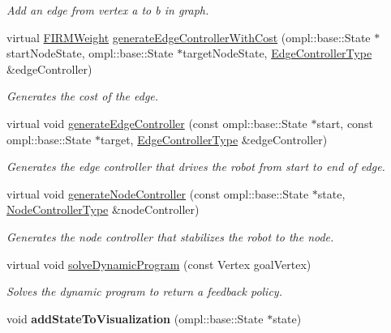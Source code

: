 \begin{DoxyCompactItemize}
\begin{DoxyCompactList}\small\item\em \-Add an edge from vertex a to b in graph. \end{DoxyCompactList}\item 
\hypertarget{class_f_i_r_m_a0f58525bdbc4277a3dae5242aa5efc04}{virtual \hyperlink{class_f_i_r_m_weight}{\-F\-I\-R\-M\-Weight} \hyperlink{class_f_i_r_m_a0f58525bdbc4277a3dae5242aa5efc04}{generate\-Edge\-Controller\-With\-Cost} (ompl\-::base\-::\-State $\ast$start\-Node\-State, ompl\-::base\-::\-State $\ast$target\-Node\-State, \hyperlink{class_f_i_r_m_a70abcb24fbc9f836b94119f65c8f8a37}{\-Edge\-Controller\-Type} \&edge\-Controller)}\label{class_f_i_r_m_a0f58525bdbc4277a3dae5242aa5efc04}

\begin{DoxyCompactList}\small\item\em \-Generates the cost of the edge. \end{DoxyCompactList}\item 
\hypertarget{class_f_i_r_m_abfccb43f41872b8da9a4609c1748d21f}{virtual void \hyperlink{class_f_i_r_m_abfccb43f41872b8da9a4609c1748d21f}{generate\-Edge\-Controller} (const ompl\-::base\-::\-State $\ast$start, const ompl\-::base\-::\-State $\ast$target, \hyperlink{class_f_i_r_m_a70abcb24fbc9f836b94119f65c8f8a37}{\-Edge\-Controller\-Type} \&edge\-Controller)}\label{class_f_i_r_m_abfccb43f41872b8da9a4609c1748d21f}

\begin{DoxyCompactList}\small\item\em \-Generates the edge controller that drives the robot from start to end of edge. \end{DoxyCompactList}\item 
\hypertarget{class_f_i_r_m_a1856164aa0dba82e6cfad26a4ef5a7fe}{virtual void \hyperlink{class_f_i_r_m_a1856164aa0dba82e6cfad26a4ef5a7fe}{generate\-Node\-Controller} (const ompl\-::base\-::\-State $\ast$state, \hyperlink{class_controller}{\-Node\-Controller\-Type} \&node\-Controller)}\label{class_f_i_r_m_a1856164aa0dba82e6cfad26a4ef5a7fe}

\begin{DoxyCompactList}\small\item\em \-Generates the node controller that stabilizes the robot to the node. \end{DoxyCompactList}\item 
virtual void \hyperlink{class_f_i_r_m_a7ffdc57247b8f40899646195750b6a20}{solve\-Dynamic\-Program} (const \-Vertex goal\-Vertex)
\begin{DoxyCompactList}\small\item\em \-Solves the dynamic program to return a feedback policy. \end{DoxyCompactList}\item 
\hypertarget{class_f_i_r_m_a4003d4144f6c32e9eaba79f292ec9ce4}{void {\bfseries add\-State\-To\-Visualization} (ompl\-::base\-::\-State $\ast$state)}\label{class_f_i_r_m_a4003d4144f6c32e9eaba79f292ec9ce4}


\end{DoxyCompactItemize}
